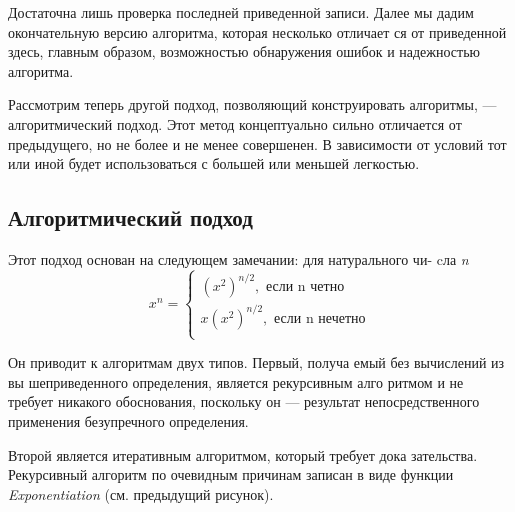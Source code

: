 \parindent=1cm Достаточна лишь проверка последней приведенной записи. Далее мы
дадим окончательную версию алгоритма, которая несколько отличает­
ся от приведенной здесь, главным образом, возможностью обнаружения
ошибок и надежностью алгоритма.

\parindent=1cm Рассмотрим теперь другой подход, позволяющий конструировать
алгоритмы, — алгоритмический подход. Этот метод концептуально
сильно отличается от предыдущего, но не более и не менее совершенен.
В зависимости от условий тот или иной будет использоваться с большей
или меньшей легкостью.
\subsection{ Алгоритмический подход}
Этот подход основан на следующем замечании: для натурального чи-
cла \textit{n}
\begin{equation*}
 x^n = 
 \begin{cases}
   (x^{2})^{n/2}, \text{ если n четно}
   \\
   x(x^{2})^{n/2}, \text{ если n нечетно}
   \\
 \end{cases}
\end{equation*}

\pagebreak
{}
\noindent Он приводит к алгоритмам
двух типов. Первый, получа­
емый без вычислений из вы­
шеприведенного определения,
является рекурсивным алго­
ритмом и не требует никакого
обоснования, поскольку он —
результат непосредственного
применения безупречного определения.

\parindent=1cm Второй является итеративным алгоритмом, который требует дока­
зательства. Рекурсивный алгоритм по очевидным причинам записан в
виде функции \textit{Exponentiation} (см. предыдущий рисунок).

